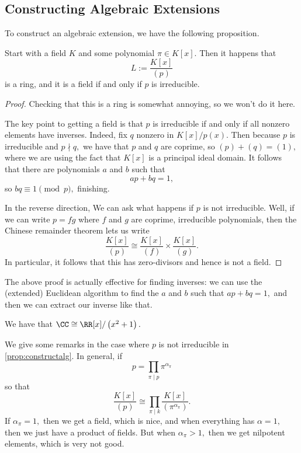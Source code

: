 \subsection{Constructing Algebraic Extensions}
To construct an algebraic extension, we have the following proposition.
\begin{proposition} \label{prop:constructalg}
	Start with a field $K$ and some polynomial $\pi\in K[x].$ Then it happens that
	\[L:=\frac{K[x]}{(p)}\]
	is a ring, and it is a field if and only if $p$ is irreducible. 
\end{proposition}
\begin{proof}
	Checking that this is a ring is somewhat annoying, so we won't do it here.
	
	The key point to getting a field is that $p$ is irreducible if and only if all nonzero elements have inverses. Indeed, fix $q$ nonzero in $K[x]/p(x).$ Then because $p$ is irreducible and $p\nmid q,$ we have that $p$ and $q$ are coprime, so $(p)+(q)=(1),$ where we are using the fact that $K[x]$ is a principal ideal domain. It follows that there are polynomials $a$ and $b$ such that
	\[ap+bq=1,\]
	so $bq\equiv1\pmod p,$ finishing.

	In the reverse direction, We can ask what happens if $p$ is not irreducible. Well, if we can write $p=fg$ where $f$ and $g$ are coprime, irreducible polynomials, then the Chinese remainder theorem lets us write
	\[\frac{K[x]}{(p)}\cong\frac{K[x]}{(f)}\times\frac{K[x]}{(g)}.\]
	In particular, it follows that this has zero-divisors and hence is not a field.
\end{proof}
\begin{remark}
	The above proof is actually effective for finding inverses: we can use the (extended) Euclidean algorithm to find the $a$ and $b$ such that $ap+bq=1,$ and then we can extract our inverse like that.
\end{remark}
\begin{example}
	We have that $\CC\cong\RR[x]/\left(x^2+1\right).$
\end{example}
We give some remarks in the case where $p$ is not irreducible in \autoref{prop:constructalg}. In general, if
\[p=\prod_{\pi\mid p}\pi^{\alpha_\pi}\]
so that
\[\frac{K[x]}{(p)}\cong\prod_{\pi\mid k}\frac{K[x]}{(\pi^{\alpha_\pi})}.\]
If $\alpha_\pi=1,$ then we get a field, which is nice, and when everything has $\alpha=1,$ then we just have a product of fields. But when $\alpha_\pi>1,$ then we get nilpotent elements, which is very not good.

